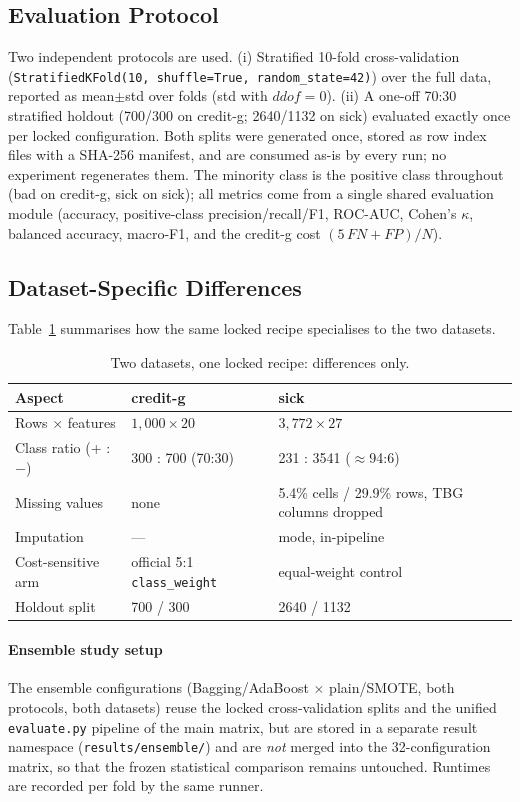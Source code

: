 \documentclass[a4paper,12pt]{article}
\begin{document}
\subsection{Evaluation Protocol}
Two independent protocols are used. (i) Stratified 10-fold
cross-validation (\texttt{StratifiedKFold(10, shuffle=True,
random\_state=42)}) over the full data, reported as mean$\pm$std over
folds (std with $ddof=0$). (ii) A one-off 70:30 stratified holdout
(700/300 on credit-g; 2640/1132 on sick) evaluated exactly once per
locked configuration. Both splits were generated once, stored as row
index files with a SHA-256 manifest, and are consumed as-is by every
run; no experiment regenerates them. The minority class is the
positive class throughout (bad on credit-g, sick on sick); all metrics
come from a single shared evaluation module (accuracy, positive-class
precision/recall/F1, ROC-AUC, Cohen's $\kappa$, balanced accuracy,
macro-F1, and the credit-g cost $(5\,\mathit{FN}+\mathit{FP})/N$).

\subsection{Dataset-Specific Differences}
Table~\ref{tab:pipeline-diff} summarises how the same locked recipe
specialises to the two datasets.
\begin{table}[htbp]\centering\small
\caption{Two datasets, one locked recipe: differences only.}
\label{tab:pipeline-diff}
\begin{tabular}{lll}
\toprule
Aspect & credit-g & sick \\
\midrule
Rows $\times$ features & $1{,}000\times 20$ & $3{,}772\times 27$ \\
Class ratio (+ : $-$) & 300 : 700 (70:30) & 231 : 3541 ($\approx$94:6) \\
Missing values & none & 5.4\% cells / 29.9\% rows, TBG columns dropped \\
Imputation & --- & mode, in-pipeline \\
Cost-sensitive arm & official 5:1 \texttt{class\_weight} & equal-weight control \\
Holdout split & 700 / 300 & 2640 / 1132 \\
\bottomrule
\end{tabular}
\end{table}

\paragraph{Ensemble study setup}
The ensemble configurations (Bagging/AdaBoost $\times$ plain/SMOTE,
both protocols, both datasets) reuse the locked cross-validation splits
and the unified \texttt{evaluate.py} pipeline of the main matrix, but
are stored in a separate result namespace (\texttt{results/ensemble/})
and are \emph{not} merged into the 32-configuration matrix, so that the
frozen statistical comparison remains untouched. Runtimes are recorded
per fold by the same runner.
\end{document}
